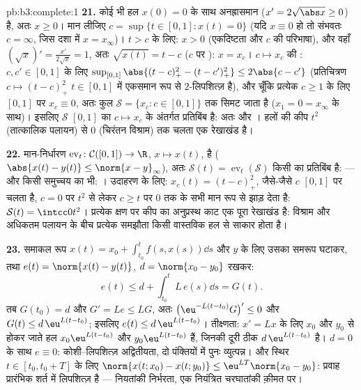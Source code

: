 \begin{solution}{pb:b3:complete:1}
\textbf{21.} कोई भी हल $x(0) = 0$ के साथ अनह्रासमान ($x' = 2\sqrt{\abs
x} \geq 0$) है, अतः
$x \geq 0$। मान लीजिए $c =
\sup\{t \in [0,1] : x(t) = 0\}$ (यदि $x \equiv 0$ हो तो संभवतः $c = \infty$, जिस दशा में
$x = x_\infty$)। $t > c$ के लिए: $x
> 0$ (एकदिष्टता और $c$ की परिभाषा), और वहाँ
$(\sqrt
x)' = \frac{x'}{2\sqrt x} = 1$, अतः $\sqrt{x(t)} = t - c$ ($c$ पर ): $x = x_c$। $c \mapsto
x_c$ की : $c, c' \in [0, 1]$
के लिए $\sup_{[0,1]}\abs{(t - c)_+^2 -
(t - c')_+^2} \leq 2\abs{c - c'}$ (प्रतिचित्रण $c \mapsto
(t-c)_+^2$ $t \in [0,1]$ में एकसमान रूप से $2$-लिपशित्ज़
है), और चूँकि प्रत्येक $c \geq 1$ के लिए $[0,1]$ पर $x_c \equiv 0$, अतः कुल $\mathcal S = \{x_c : c \in [0,1]\}$
तक सिमट जाता है ($x_1 = 0 = x_\infty$ के साथ)। इसलिए $\mathcal S$   $[0,1]$ का
 $c
\mapsto x_c$ के अंतर्गत प्रतिबिंब है: अतः  और ।
हलों की कीप $t^2$ (तात्कालिक पलायन) से $0$ (चिरंतन विश्राम) तक
चलता एक  रेखाखंड है।

\textbf{22.} मान-निर्धारण $\operatorname{ev}_t\colon
\mathcal C([0,1]) \to \R$, $x \mapsto x(t)$,  है ($\abs{x(t) - y(t)} \leq \norm{x - y}_\infty$), अतः $\mathcal
S(t) = \operatorname{ev}_t(\mathcal S)$
किसी  का  प्रतिबिंब है:  --- और किसी  समुच्चय का
भी: । उदाहरण के लिए: $x_c(t) = (t - c)_+^2$, जैसे-जैसे $c$ $[0, 1]$ पर चलता है,
$c = 0$ पर $t^2$ से लेकर $c \geq t$ पर $0$ तक के सभी मान  रूप से
झाड़ देता है: $\mathcal S(t) =
\intcc0{t^2}$। प्रत्येक क्षण पर कीप का अनुप्रस्थ काट एक पूरा
रेखाखंड है: विश्राम और अधिकतम पलायन के बीच प्रत्येक समझौता किसी
वास्तविक हल से साकार होता है।

\textbf{23.} समाकल रूप $x(t) = x_0 +
\int_{t_0}^tf(s, x(s))\dd s$ और $y$ के लिए उसका समरूप घटाकर, तथा
$e(t) = \norm{x(t) - y(t)}$, $d = \norm{x_0 - y_0}$ रखकर:
\[
e(t) \leq d + \int_{t_0}^tL\,e(s)\dd s = G(t).
\]
तब $G(t_0) = d$ और $G' = Le \leq LG$, अतः $\bigl(\eu^{-L(t
- t_0)}G\bigr)' \leq 0$ और $G(t) \leq d\,\eu^{L(t - t_0)}$; इसलिए $e(t) \leq d\,\eu^{L(t-t_0)}$। तीक्ष्णता:
$x' =
Lx$ के लिए $x_0$ और $y_0$ से होकर जाते हल $x_0\eu^{L(t -
t_0)}$ और $y_0\eu^{L(t-t_0)}$ हैं, जिनकी
दूरी ठीक $d\,\eu^{L(t-t_0)}$ है। $d = 0$ के साथ $e \equiv 0$: कोशी--लिपशित्ज़ अद्वितीयता,
दो पंक्तियों में पुनः व्युत्पन्न। और स्थिर $t \in [t_0, t_0 + T]$ के लिए $\norm{x(t; x_0) - x(t;
y_0)} \leq \eu^{LT}\norm{x_0 - y_0}$: प्रवाह
प्रारंभिक शर्त में लिपशित्ज़ है --- नियतांकी निर्भरता, एक नियंत्रित
चरघातांकी क़ीमत पर।


\end{solution}

